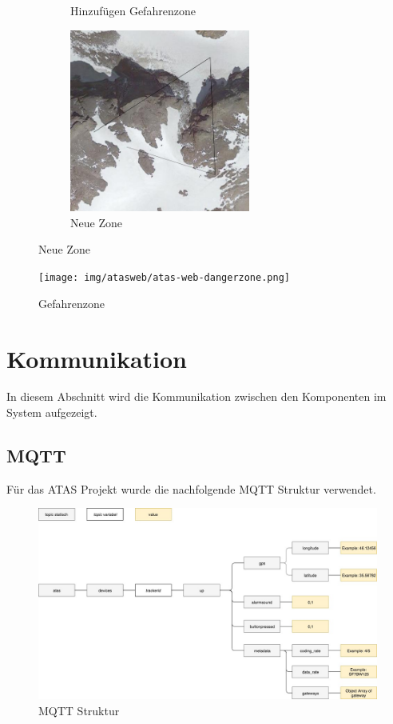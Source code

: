 \documentclass[11pt,english,german]{report}
\theoremstyle{definition}
\begin{document}
\begin{figure}[H]
\begin{subfigure}{.2\textwidth}
		\caption[Knopf zum hinzufügen von Gefahrenzonen]
		{Hinzufügen Gefahrenzone}
	\end{subfigure}%
	\begin{subfigure}{.6\textwidth}
		\centering
		\includegraphics[width=0.65\textwidth]{img/atasweb/atas-web-drawing.png}
		\caption[Neue Zone zeichnen]
		{Neue Zone}
	\end{subfigure}%
\end{figure}
\begin{figure}[H]
	\centering
	\texttt{[image: img/atasweb/atas-web-dangerzone.png]}
	\caption[Gefahrenzone]
	{Gefahrenzone}
\end{figure}%

\section{Kommunikation}
In diesem Abschnitt wird die Kommunikation zwischen den Komponenten im System aufgezeigt.
\subsection{MQTT}
Für das ATAS Projekt wurde die nachfolgende MQTT Struktur verwendet.
\begin{figure}[H]
	\centering
	\includegraphics[width=\textwidth]{img/system/ATAS_MQTT_Topic_BA.jpg}
	\caption[MQTT Struktur]
	{MQTT Struktur}
\end{figure}
\end{document}
